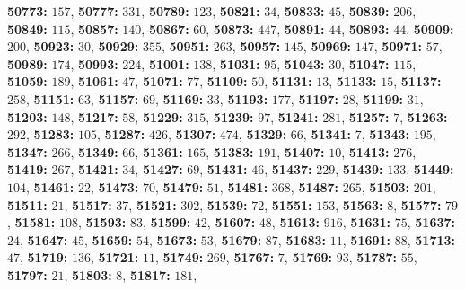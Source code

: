 \textsf{\bfseries 50773:} $157$, \textsf{\bfseries 50777:} $331$, \textsf{\bfseries 50789:} $123$, \textsf{\bfseries 50821:} $34$, \textsf{\bfseries 50833:} $45$, \textsf{\bfseries 50839:} $206$, \textsf{\bfseries 50849:} $115$, \textsf{\bfseries 50857:} $140$, \textsf{\bfseries 50867:} $60$, \textsf{\bfseries 50873:} $447$, \textsf{\bfseries 50891:} $44$, \textsf{\bfseries 50893:} $44$, \textsf{\bfseries 50909:} $200$, \textsf{\bfseries 50923:} $30$, \textsf{\bfseries 50929:} $355$, \textsf{\bfseries 50951:} $263$, \textsf{\bfseries 50957:} $145$, \textsf{\bfseries 50969:} $147$, \textsf{\bfseries 50971:} $57$, \textsf{\bfseries 50989:} $174$, \textsf{\bfseries 50993:} $224$, \textsf{\bfseries 51001:} $138$, \textsf{\bfseries 51031:} $95$, \textsf{\bfseries 51043:} $30$, \textsf{\bfseries 51047:} $115$, \textsf{\bfseries 51059:} $189$, \textsf{\bfseries 51061:} $47$, \textsf{\bfseries 51071:} $77$, \textsf{\bfseries 51109:} $50$, \textsf{\bfseries 51131:} $13$, \textsf{\bfseries 51133:} $15$, \textsf{\bfseries 51137:} $258$, \textsf{\bfseries 51151:} $63$, \textsf{\bfseries 51157:} $69$, \textsf{\bfseries 51169:} $33$, \textsf{\bfseries 51193:} $177$, \textsf{\bfseries 51197:} $28$, \textsf{\bfseries 51199:} $31$, \textsf{\bfseries 51203:} $148$, \textsf{\bfseries 51217:} $58$, \textsf{\bfseries 51229:} $315$, \textsf{\bfseries 51239:} $97$, \textsf{\bfseries 51241:} $281$, \textsf{\bfseries 51257:} $7$, \textsf{\bfseries 51263:} $292$, \textsf{\bfseries 51283:} $105$, \textsf{\bfseries 51287:} $426$, \textsf{\bfseries 51307:} $474$, \textsf{\bfseries 51329:} $66$, \textsf{\bfseries 51341:} $7$, \textsf{\bfseries 51343:} $195$, \textsf{\bfseries 51347:} $266$, \textsf{\bfseries 51349:} $66$, \textsf{\bfseries 51361:} $165$, \textsf{\bfseries 51383:} $191$, \textsf{\bfseries 51407:} $10$, \textsf{\bfseries 51413:} $276$, \textsf{\bfseries 51419:} $267$, \textsf{\bfseries 51421:} $34$, \textsf{\bfseries 51427:} $69$, \textsf{\bfseries 51431:} $46$, \textsf{\bfseries 51437:} $229$, \textsf{\bfseries 51439:} $133$, \textsf{\bfseries 51449:} $104$, \textsf{\bfseries 51461:} $22$, \textsf{\bfseries 51473:} $70$, \textsf{\bfseries 51479:} $51$, \textsf{\bfseries 51481:} $368$, \textsf{\bfseries 51487:} $265$, \textsf{\bfseries 51503:} $201$, \textsf{\bfseries 51511:} $21$, \textsf{\bfseries 51517:} $37$, \textsf{\bfseries 51521:} $302$, \textsf{\bfseries 51539:} $72$, \textsf{\bfseries 51551:} $153$, \textsf{\bfseries 51563:} $8$, \textsf{\bfseries 51577:} $79$, \textsf{\bfseries 51581:} $108$, \textsf{\bfseries 51593:} $83$, \textsf{\bfseries 51599:} $42$, \textsf{\bfseries 51607:} $48$, \textsf{\bfseries 51613:} $916$, \textsf{\bfseries 51631:} $75$, \textsf{\bfseries 51637:} $24$, \textsf{\bfseries 51647:} $45$, \textsf{\bfseries 51659:} $54$, \textsf{\bfseries 51673:} $53$, \textsf{\bfseries 51679:} $87$, \textsf{\bfseries 51683:} $11$, \textsf{\bfseries 51691:} $88$, \textsf{\bfseries 51713:} $47$, \textsf{\bfseries 51719:} $136$, \textsf{\bfseries 51721:} $11$, \textsf{\bfseries 51749:} $269$, \textsf{\bfseries 51767:} $7$, \textsf{\bfseries 51769:} $93$, \textsf{\bfseries 51787:} $55$, \textsf{\bfseries 51797:} $21$, \textsf{\bfseries 51803:} $8$, \textsf{\bfseries 51817:} $181$, 
